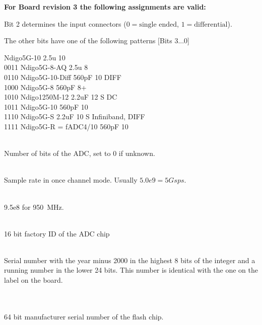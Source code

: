             \noindent\textbf{For Board revision 3 the following assignments are valid:}\par

            \noindent Bit 2 determines the input connectors ($0 = \text{single ended}$, $1 = \text{differential}$).\par

            \noindent The other bits have one of the following patterns [Bits 3...0]\par

             Ndigo5G-10 2.5u 10\\
            0011 Ndigo5G-8-AQ 2.5u 8\\
            0110 Ndigo5G-10-Diff 560pF 10 DIFF\\
            1000 Ndigo5G-8 560pF 8+\\
            1010 Ndigo1250M-12 2.2uF 12 S DC\\
            1011 Ndigo5G-10 560pF 10\\
            1110 Ndigo5G-S 2.2uF 10 S Infiniband, DIFF\\
            1111 Ndigo5G-R = fADC4/10 560pF 10\par

            \\
            Number of bits of the ADC, set to 0 if unknown.\par

            \\
            Sample rate in once channel mode. Usually $5.0e9 = 5 Gsps$.\par

            \\
            9.5e8 for \SI{950}{\MHz}.

            \\
            16 bit factory ID of the ADC chip\par

            \\
            Serial number with the year minus 2000 in the highest 8 bits of the integer and a running number in the lower 24 bits. This number is identical with the one on the label on the board.\par

            \\
            \\
            64 bit manufacturer serial number of the flash chip.\par

